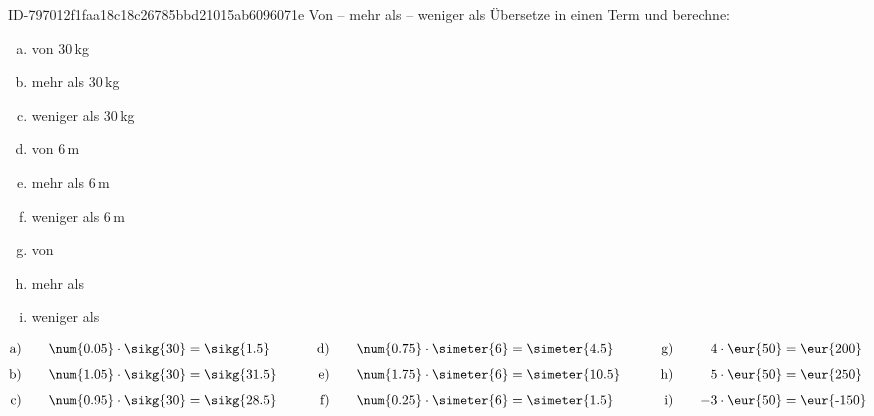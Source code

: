 \begin{exercise}
      {ID-797012f1faa18c18c26785bbd21015ab6096071e}
      {Von -- mehr als -- weniger als}
  \ifproblem\problem
    Übersetze in einen Term und berechne:\\
    \begin{minipage}[t]{0.32\textwidth}
      \begin{enumerate}[a)]
        \item {} von 30\,kg
        \item {} mehr als 30\,kg
        \item {} weniger als 30\,kg
      \end{enumerate}
    \end{minipage}%
    \hfill
    \begin{minipage}[t]{0.32\textwidth}
      \begin{enumerate}[a)]
        \setcounter{enumi}{3}
        \item {} von 6\,m
        \item {} mehr als 6\,m
        \item {} weniger als 6\,m
      \end{enumerate}
    \end{minipage}%
    \hfill
    \begin{minipage}[t]{0.32\textwidth}
      \begin{enumerate}[a)]
        \setcounter{enumi}{6}
        \item {} von 
        \item {} mehr als 
        \item {} weniger als 
      \end{enumerate}
    \end{minipage}
  \fi
  \ifoutcome\outcome
    {\setlength{\abovedisplayskip}{0pt}%
    \begin{alignat*}{6}
      \text{a)}&\quad & \num{0.05}\cdot\sikg{30}&=\sikg{1.5}  & \qquad\text{d)}&\quad & \num{0.75}\cdot\simeter{6}&=\simeter{4.5}  & \qquad\text{g)}&\quad &  4\cdot\text{\eur{50}}&=\text{\eur{200}}  \\[1ex]
      \text{b)}&\quad & \num{1.05}\cdot\sikg{30}&=\sikg{31.5} & \qquad\text{e)}&\quad & \num{1.75}\cdot\simeter{6}&=\simeter{10.5} & \qquad\text{h)}&\quad &  5\cdot\text{\eur{50}}&=\text{\eur{250}}  \\[1ex]
      \text{c)}&\quad & \num{0.95}\cdot\sikg{30}&=\sikg{28.5} & \qquad\text{f)}&\quad & \num{0.25}\cdot\simeter{6}&=\simeter{1.5}  & \qquad\text{i)}&\quad & -3\cdot\text{\eur{50}}&=\text{\eur{-150}}
    \end{alignat*}}
  \fi
\end{exercise}
